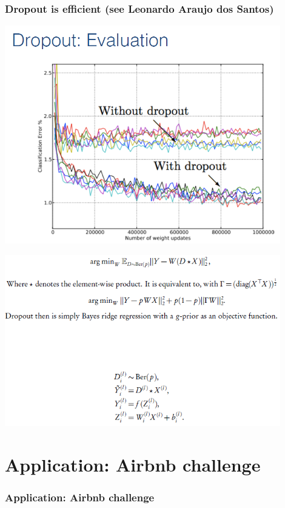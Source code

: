 \documentclass{beamer}
\begin{document}
\begin{frame}
\frametitle{Dropout is efficient (see Leonardo Araujo dos Santos)}
\includegraphics[width=0.9\textwidth]{images/drop_out_6.PNG} \\
\end{frame}
\begin{frame}
\includegraphics[width=0.9\textwidth]{images/drop_out_7.PNG} \\
\end{frame}

\section{Application: Airbnb challenge}
\begin{frame}
\frametitle{Application: Airbnb challenge}
\end{frame}
\end{document}
